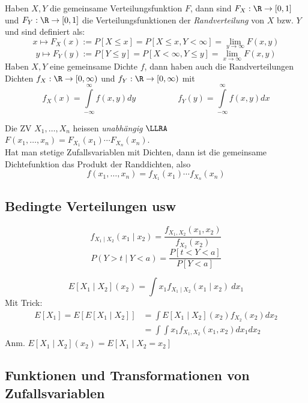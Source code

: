 \begin{definition}
Haben $X,Y$ die gemeinsame Verteilungsfunktion $F$, dann sind $F_X:\R\to[0,1]$ und $F_Y:\R\to[0,1]$ die Verteilungsfunktionen der \textit{Randverteilung} von $X$ bzw. $Y$ und sind definiert als:
$$ x \mapsto F_X(x) := P[X \leq x] = P[X \leq x, Y < \infty] = \lim_{y\to \infty} F(x,y)$$
$$ y \mapsto F_Y(y) := P[Y \leq y] = P[X < \infty, Y \leq y] = \lim_{x\to \infty} F(x,y)$$
Haben $X,Y$ eine gemeinsame Dichte $f$, dann haben auch die Randverteilungen Dichten $f_X:\R\to [0, \infty)$ und $f_Y:\R \to [0, \infty)$ mit
$$ f_X(x) = \int\limits_{-\infty}^{\infty} f(x,y) dy \quad \quad \quad \quad \quad f_Y(y) = \int \limits_{-\infty}^{\infty} f(x,y) dx$$
\end{definition}

\begin{definition}
Die ZV $X_1,\dots,X_n$ heissen \textit{unabhängig} $\LLRA$ $F(x_1,\dots,x_n) = F_{X_1}(x_1) \cdots F_{X_n}(x_n)$.\\
Hat man stetige Zufallsvariablen mit Dichten, dann ist die gemeinsame Dichtefunktion das Produkt der Randdichten, also
$$ f(x_1, \dots, x_n) = f_{X_1}(x_1) \cdots f_{X_n}(x_n)$$
\end{definition}

\subsection{Bedingte Verteilungen usw}

\begin{definition}

$$ f_{X_1 \mid X_2}(x_1\mid x_2) = \frac{f_{X_1, X_2}(x_1, x_2)}{f_{X_2}(x_2)}$$
$$ P(Y > t\mid Y < a) = \frac{P[t < Y < a]}{P[Y < a]}$$

$$ E[X_1 \mid X_2](x_2) = \int x_1 f_{X_1 \mid X_2}(x_1\mid x_2)\ dx_1$$
Mit Trick:
\begin{align*}
	E[X_1] = E[E[X_1 \mid X_2]] &= \int E[X_1 \mid X_2](x_2) f_{X_2}(x_2) dx_2\\
	&=\int \int x_1 f_{X_1, X_2}(x_1, x_2) dx_1 dx_2
\end{align*}
Anm. $E[X_1 \mid X_2](x_2) = E[X_1 \mid X_2=x_2]$ 
\end{definition}

\subsection{Funktionen und Transformationen von Zufallsvariablen}
